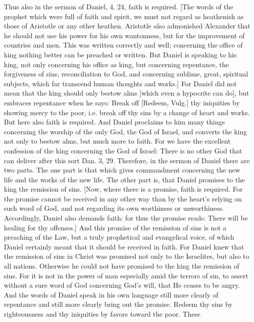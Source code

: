 Thus also in the sermon of Daniel, 4, 24, faith is required.  [The
words of the prophet which were full of faith and spirit, we must not
regard as heathenish as those of Aristotle or any other heathen.
Aristotle also admonished Alexander that he should not use his power
for his own wantonness, but for the improvement of countries and men.
This was written correctly and well; concerning the office of king
nothing better can be preached or written.  But Daniel is speaking to
his king, not only concerning his office as king, but concerning
repentance, the forgiveness of sins, reconciliation to God, and
concerning sublime, great, spiritual subjects, which far transcend
human thoughts and works.] For Daniel did not mean that the king
should only bestow alms [which even a hypocrite can do], but embraces
repentance when he says: Break off [Redeem, Vulg.] thy iniquities by
showing mercy to the poor, i.e. break off thy sins by a change of
heart and works.  But here also faith is required.  And Daniel
proclaims to him many things concerning the worship of the only God,
the God of Israel, and converts the king not only to bestow alms, but
much more to faith.  For we have the excellent confession of the king
concerning the God of Israel: There is no other God that can deliver
after this sort Dan. 3, 29. Therefore, in the sermon of Daniel there
are two parts.  The one part is that which gives commandment
concerning the new life and the works of the new life.  The other
part is, that Daniel promises to the king the remission of sins.
[Now, where there is a promise, faith is required.  For the promise
cannot be received in any other way than by the heart's relying on
such word of God, and not regarding its own worthiness or
unworthiness.  Accordingly, Daniel also demands faith: for thus the
promise reads: There will be healing for thy offenses.] And this
promise of the remission of sins is not a preaching of the Law, but a
truly prophetical and evangelical voice, of which Daniel certainly
meant that it should be received in faith.  For Daniel knew that the
remission of sins in Christ was promised not only to the Israelites,
but also to all nations.  Otherwise he could not have promised to the
king the remission of sins.  For it is not in the power of man
especially amid the terrors of sin, to assert without a sure word of
God concerning God's will, that He ceases to be angry.  And the words
of Daniel speak in his own language still more clearly of repentance
and still more clearly bring out the promise.  Redeem thy sins by
righteousness and thy iniquities by favors toward the poor.  These
